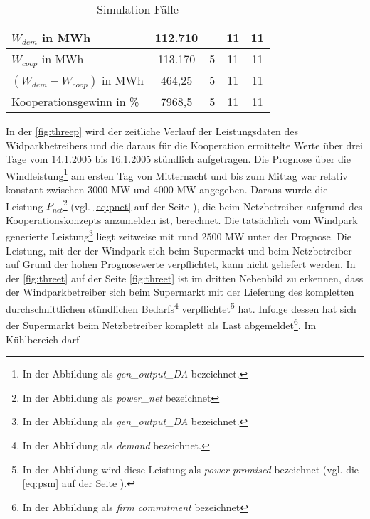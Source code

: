 \begin{table}
{\begin{tabularx}{\textwidth}{X|X|X|X|X|X|X|X|X|}
\hline
\hline
\multicolumn{1}{|l|}{$W_{dem}$ in MWh } & \multicolumn{2}{c|}{112.710} &
\multicolumn{2}{c|}{} & \multicolumn{2}{c|}{11} & \multicolumn{2}{c|}{11}\\
\hline
\multicolumn{1}{|l|}{$W_{coop}$ in MWh} & \multicolumn{2}{c|}{113.170} &
\multicolumn{2}{c|}{5} & \multicolumn{2}{c|}{11} & \multicolumn{2}{c|}{11}\\
\hline
\multicolumn{1}{|l|}{$(W_{dem} - W_{coop})$ in MWh} & \multicolumn{2}{c|}{464,25} &
\multicolumn{2}{c|}{5} & \multicolumn{2}{c|}{11} & \multicolumn{2}{c|}{11}\\
\hline
\hline
\multicolumn{1}{|l|}{Kooperationsgewinn in \%} & \multicolumn{2}{c|}{7968,5} &
\multicolumn{2}{c|}{5} & \multicolumn{2}{c|}{11} & \multicolumn{2}{c|}{11}\\
\hline


\end{tabularx}
}
\caption{Simulation F\"alle}
\label{t:faelle}
\end{table}

In der \cref{fig:threep} wird der zeitliche Verlauf der Leistungsdaten des
Widparkbetreibers und die daraus f\"ur die Kooperation ermittelte Werte \"uber
drei Tage vom 14.1.2005 bis 16.1.2005 st\"undlich aufgetragen. Die Prognose
\"uber die Windleistung\footnote{ In der Abbildung als
\textit{gen\_output\_DA} bezeichnet.} am ersten Tag von Mitternacht und bis zum
Mittag war relativ konstant zwischen 3000 MW und 4000 MW angegeben. Daraus wurde
die Leistung $P_{net}$\footnote{ In der Abbildung als \textit{power\_net}
bezeichnet} (vgl.  \cref{eq:pnet} auf der Seite \pageref{eq:pnet}), die beim
Netzbetreiber aufgrund des Kooperationskonzepts anzumelden ist, berechnet. Die
tats\"achlich vom Windpark generierte Leistung\footnote{ In der Abbildung
als \textit{gen\_output\_DA} bezeichnet.} liegt zeitweise mit rund 2500 MW
unter der Prognose. Die Leistung, mit der der Windpark sich beim Supermarkt und
beim Netzbetreiber auf Grund der hohen Prognosewerte verpflichtet, kann nicht
geliefert werden. In der \cref{fig:threet} auf der Seite \cref{fig:threet} ist
im dritten Nebenbild zu erkennen, dass der Windparkbetreiber sich beim
Supermarkt mit der Lieferung des kompletten durchschnittlichen st\"undlichen
Bedarfs\footnote{ In der Abbildung als \textit{demand} bezeichnet.}
verpflichtet\footnote{ In der Abbildung wird diese Leistung als
\textit{power promised} bezeichnet (vgl. die \cref{eq:psm} auf der Seite
\pageref{eq:psm}).}  hat. Infolge dessen hat sich der Supermarkt beim
Netzbetreiber komplett als Last abgemeldet\footnote{ In der Abbildung als
\textit{firm commitment} bezeichnet}. Im K\"uhlbereich darf

